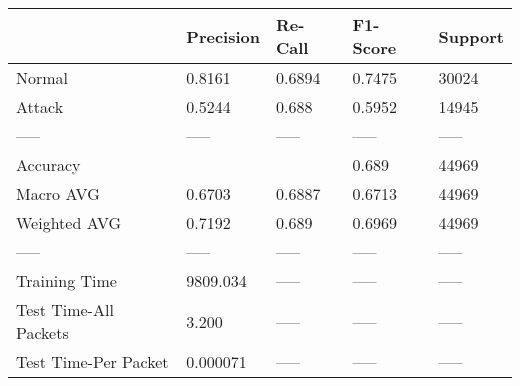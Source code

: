 \begin{tabular}{lllll}
\toprule
{} & Precision & Re-Call & F1-Score & Support \\
\midrule
Normal                &    0.8161 &  0.6894 &   0.7475 &   30024 \\
Attack                &    0.5244 &   0.688 &   0.5952 &   14945 \\
-----                 &     ----- &   ----- &    ----- &   ----- \\
Accuracy              &           &         &    0.689 &   44969 \\
Macro AVG             &    0.6703 &  0.6887 &   0.6713 &   44969 \\
Weighted AVG          &    0.7192 &   0.689 &   0.6969 &   44969 \\
-----                 &     ----- &   ----- &    ----- &   ----- \\
Training Time         &  9809.034 &   ----- &    ----- &   ----- \\
Test Time-All Packets &     3.200 &   ----- &    ----- &   ----- \\
Test Time-Per Packet  &  0.000071 &   ----- &    ----- &   ----- \\
\bottomrule
\end{tabular}
